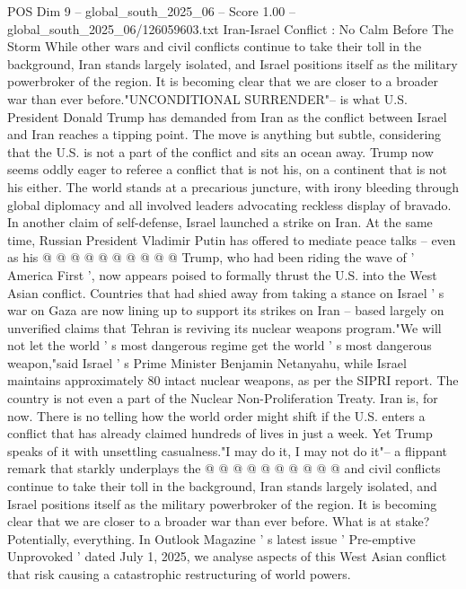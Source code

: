 \begin{textsample}{POS Dim 9 – global\_south\_2025\_06 – Score 1.00 – global\_south\_2025\_06/126059603.txt}  \label{ex:f9_pos_178}
Iran-Israel Conflict : No Calm Before The Storm While other wars and civil conflicts continue to take their toll in the background, Iran stands largely isolated, and Israel positions itself as the military powerbroker of the region.
It is becoming clear that we are closer to a broader war than ever before."UNCONDITIONAL SURRENDER"-- is what U.S.
President Donald Trump has demanded from Iran as the conflict between Israel and Iran reaches a tipping point.
The move is anything but subtle, considering that the U.S. is not a part of the conflict and sits an ocean away.
Trump now seems oddly eager to referee a conflict that is not his, on a continent that is not his either.
The world stands at a precarious juncture, with irony bleeding through global diplomacy and all involved leaders advocating reckless display of bravado.
In another claim of self-defense, Israel launched a strike on Iran.
At the same time, Russian President Vladimir Putin has offered to mediate peace talks -- even as his @ @ @ @ @ @ @ @ @ @ Trump, who had been riding the wave of ' America First ', now appears poised to formally thrust the U.S. into the West Asian conflict.
Countries that had shied away from taking a stance on Israel ' s war on Gaza are now lining up to support its strikes on Iran -- based largely on unverified claims that Tehran is reviving its nuclear weapons program."We will not let the world ' s most dangerous regime get the world ' s most dangerous weapon,"said Israel ' s Prime Minister Benjamin Netanyahu, while Israel maintains approximately 80 intact nuclear weapons, as per the SIPRI report.
The country is not even a part of the Nuclear Non-Proliferation Treaty.
Iran is, for now.
There is no telling how the world order might shift if the U.S. enters a conflict that has already claimed hundreds of lives in just a week.
Yet Trump speaks of it with unsettling casualness."I may do it, I may not do it"-- a flippant remark that starkly underplays the @ @ @ @ @ @ @ @ @ @ and civil conflicts continue to take their toll in the background, Iran stands largely isolated, and Israel positions itself as the military powerbroker of the region.
It is becoming clear that we are closer to a broader war than ever before.
What is at stake?
Potentially, everything.
In Outlook Magazine ' s latest issue ' Pre-emptive Unprovoked ' dated July 1, 2025, we analyse aspects of this West Asian conflict that risk causing a catastrophic restructuring of world powers.

\end{textsample}

